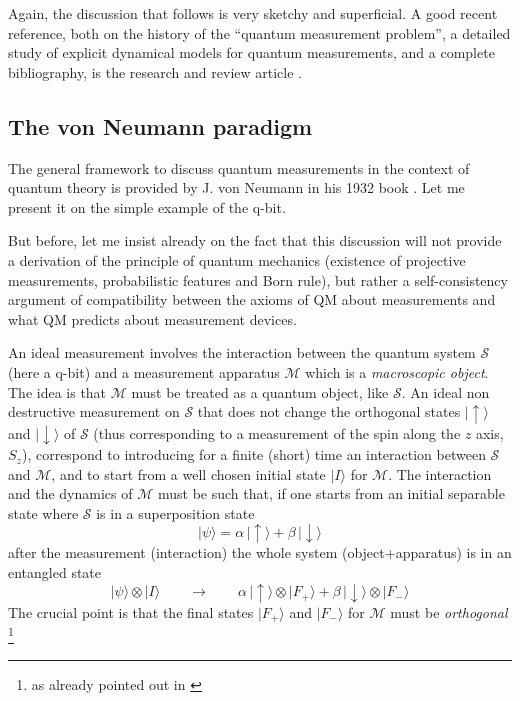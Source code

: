 Again, the discussion that follows is very sketchy and superficial. A good recent reference, both on the history of the ``quantum measurement problem'', a detailed study of explicit dynamical models for quantum measurements, and a complete bibliography, is the research and review 
article \cite{AlBaNi2012}. 
\subsection{The von Neumann paradigm}
The general framework to discuss quantum measurements in the context of quantum theory is provided by J. von Neumann
  in his 1932 book \cite{vonNeumann32G,vonNeumann32}.
Let me present it on the simple example of the q-bit.

But before, let me insist already on the fact that this discussion will not provide a derivation of the principle of quantum mechanics (existence of projective measurements, probabilistic features and Born rule), but rather a self-consistency argument of compatibility between the axioms of QM about measurements and what QM predicts about measurement devices.

An ideal measurement involves the interaction between the quantum system $\mathcal{S}$ (here a q-bit) and a measurement apparatus $\mathcal{M}$ which is a \emph{macroscopic object}.
The idea is that $\mathcal{M}$ must be treated as a quantum object, like $\mathcal{S}$.
An ideal non destructive measurement on $\mathcal{S}$ that does not change the orthogonal states  $|{\uparrow}\rangle$ and  $|{\downarrow}\rangle$ of $\mathcal{S}$ (thus corresponding to a measurement of the spin along the $z$ axis, $S_z$), correspond to introducing for a finite (short) time an interaction between $\mathcal{S}$ and $\mathcal{M}$, and to start from a well chosen initial state $|I\rangle$ for $\mathcal{M}$. The interaction and the dynamics of $\mathcal{M}$ must be such that, if one starts from an initial separable state where $\mathcal{S}$ is in a superposition state
\begin{equation}
\label{UMeasEv}
|\psi\rangle=\alpha\, |{\uparrow}\rangle+\beta\, |{\downarrow}\rangle
\end{equation}
after the measurement (interaction) the whole system (object+apparatus) is in an entangled state
\begin{equation}
\label{ }
|\psi\rangle\otimes |I\rangle\qquad\to\qquad\alpha\,|{\uparrow}\rangle\otimes |F_+\rangle + \beta\, |{\downarrow}\rangle\otimes|F_-\rangle
\end{equation}
The crucial point is that the final states $|F_+\rangle$ and $|F_-\rangle$ for $\mathcal{M}$ must be \emph{orthogonal} 
\footnote{as already pointed out in \cite{vonNeumann32G}   }

